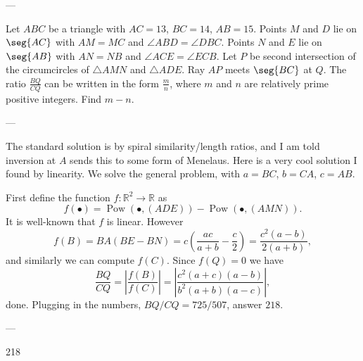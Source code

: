 
---

Let $ABC$ be a triangle with $AC=13$, $BC=14$, $AB=15$. Points $M$ and $D$ lie on $\seg{AC}$ with $AM=MC$ and $\angle ABD=\angle DBC$. Points $N$ and $E$ lie on $\seg{AB}$ with $AN=NB$ and $\angle ACE=\angle ECB$. Let $P$ be second intersection of the circumcircles of $\triangle AMN$ and $\triangle ADE$. Ray $AP$ meets $\seg{BC}$ at $Q$. The ratio $\frac{BQ}{CQ}$ can be written in the form $\frac mn$, where $m$ and $n$ are relatively prime positive integers. Find $m-n$.

---

The standard solution is by spiral similarity/length ratios, and I am told inversion at $A$ sends this to some form of Menelaus. Here is a very cool solution I found by linearity. We solve the general problem, with $a=BC$, $b=CA$, $c=AB$. 

First define the function $f:\mathbb R^2\to\mathbb R$ as \[f(\bullet)=\operatorname{Pow}(\bullet,(ADE))-\operatorname{Pow}(\bullet,(AMN)).\]
It is well-known that $f$ is linear. However \[f(B)=BA(BE-BN)=c\left(\frac{ac}{a+b}-\frac c2\right)=\frac{c^2(a-b)}{2(a+b)},\]
and similarly we can compute $f(C)$. Since $f(Q)=0$ we have \[\frac{BQ}{CQ}=\left|\frac{f(B)}{f(C)}\right|=\left|\frac{c^2(a+c)(a-b)}{b^2(a+b)(a-c)}\right|,\]
done. Plugging in the numbers, $BQ/CQ=725/507$, answer $218$.

---

218
